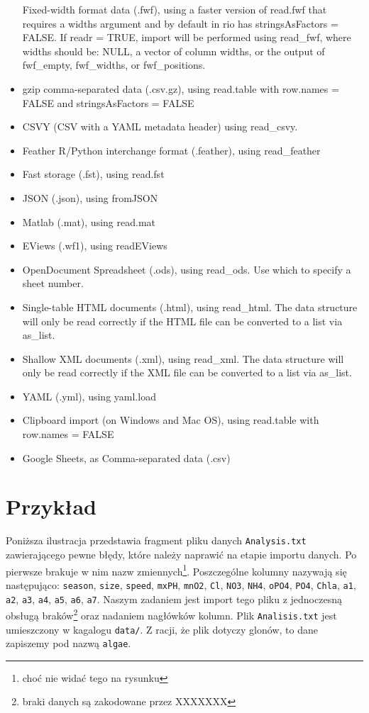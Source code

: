 \documentclass[]{book}
\let\rmarkdownfootnote\footnote%
\def\footnote{\protect\rmarkdownfootnote}
\theoremstyle{plain}
\theoremstyle{definition}
\begin{document}
\begin{itemize}
  Fixed-width format data (.fwf), using a faster version of read.fwf that requires a widths argument and by default in rio has stringsAsFactors = FALSE. If readr = TRUE, import will be performed using read\_fwf, where widths should be: NULL, a vector of column widths, or the output of fwf\_empty, fwf\_widths, or fwf\_positions.
\item
  gzip comma-separated data (.csv.gz), using read.table with row.names = FALSE and stringsAsFactors = FALSE
\item
  CSVY (CSV with a YAML metadata header) using read\_csvy.
\item
  Feather R/Python interchange format (.feather), using read\_feather
\item
  Fast storage (.fst), using read.fst
\item
  JSON (.json), using fromJSON
\item
  Matlab (.mat), using read.mat
\item
  EViews (.wf1), using readEViews
\item
  OpenDocument Spreadsheet (.ods), using read\_ods. Use which to specify a sheet number.
\item
  Single-table HTML documents (.html), using read\_html. The data structure will only be read correctly if the HTML file can be converted to a list via as\_list.
\item
  Shallow XML documents (.xml), using read\_xml. The data structure will only be read correctly if the XML file can be converted to a list via as\_list.
\item
  YAML (.yml), using yaml.load
\item
  Clipboard import (on Windows and Mac OS), using read.table with row.names = FALSE
\item
  Google Sheets, as Comma-separated data (.csv)
\end{itemize}

\hypertarget{przyk1}{%
\section{Przykład}\label{przyk1}}

Poniższa ilustracja przedstawia fragment pliku danych \texttt{Analysis.txt} zawierającego pewne błędy, które należy naprawić na etapie importu danych. Po pierwsze brakuje w nim nazw zmiennych\footnote{choć nie widać tego na rysunku}. Poszczególne kolumny nazywają się następująco: \texttt{season}, \texttt{size}, \texttt{speed}, \texttt{mxPH}, \texttt{mnO2}, \texttt{Cl}, \texttt{NO3}, \texttt{NH4}, \texttt{oPO4}, \texttt{PO4}, \texttt{Chla}, \texttt{a1}, \texttt{a2}, \texttt{a3}, \texttt{a4}, \texttt{a5}, \texttt{a6}, \texttt{a7}. Naszym zadaniem jest import tego pliku z jednoczesną obsługą braków\footnote{braki danych są zakodowane przez XXXXXXX} oraz nadaniem nagłówków kolumn. Plik \texttt{Analisis.txt} jest umieszczony w kagalogu \texttt{data/}. Z racji, że plik dotyczy glonów, to dane zapiszemy pod nazwą \texttt{algae}.
\end{document}
